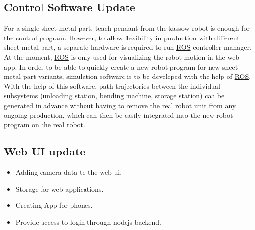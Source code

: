 \subsection{Control Software Update}
\label{subsec:control-software-update}
For a single sheet metal part, teach pendant from the kassow robot is enough for the control program.
However, to allow flexibility in production with different sheet metal part, a separate hardware is required
to run \hyperref[acro:ROS]{ROS} controller manager.
At the moment, \hyperref[acro:ROS]{ROS} is only used for visualizing the robot motion in the web app.
In order to be able to quickly create a new robot program for new sheet metal part variants, simulation
software is to be developed with the help of \hyperref[acro:ROS]{ROS}. With the help of this software, path trajectories between
the individual subsystems (unloading station, bending machine, storage station) can be generated in
advance without having to remove the real robot unit from any ongoing production, which can
then be easily integrated into the new robot program on the real robot.

\subsection{Web UI update}
\label{subsec:web-ui-update}
\begin{itemize}
    \item Adding camera data to the web ui.
    \item Storage for web applications.
    \item Creating App for phones.
    \item Provide access to login through nodejs backend.
\end{itemize}